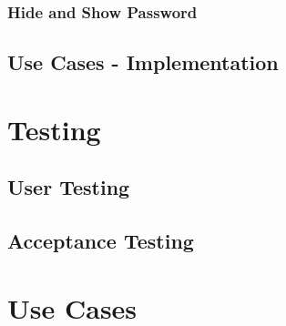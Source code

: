\documentclass[12pt]{article}
\begin{document}
	\subsubsection{Hide and Show Password}
	
	\subsection{Use Cases - Implementation}
	
	\section{Testing}
	\subsection{User Testing}
	\subsection{Acceptance Testing}
	\cite{Humble and Farley, 2010, chapter 8}
	

	
	
	
	\appendix
	\appendixpage
	\section{Use Cases}
	\label{chap:use-cases}
	
\end{document}

